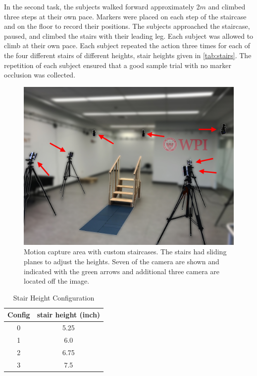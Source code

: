  In the second task, the subjects walked forward approximately 2$m$ and climbed three steps at their own pace. Markers were placed on each step of the staircase and on the floor to record their positions. The subjects approached the staircase, paused, and climbed the stairs with their leading leg. Each subject was allowed to climb at their own pace. Each subject repeated the action three times for each of the four different stairs of different heights, stair heights given in \autoref{tab:stairs}. The repetition of each subject ensured that a good sample trial with no marker occlusion was collected.   
 \begin{figure}[h]
    \centering 
    \includegraphics[scale=0.1,frame]{images/gait_data/stairs_EDIT.jpg}
    \caption[Motion Capture Area]{Motion capture area with custom staircases. The stairs had sliding planes to adjust the heights. Seven of the camera are shown and indicated with the green arrows and additional three camera are located off the image.  }
    \label{fig:mocap} 
\end{figure} 
 
\begin{table}[h!]
\centering
 \begin{tabular}{||c c ||} 
 \hline
 Config & stair height (inch) \\ [0.5ex] 
 \hline\hline
 0 & 5.25  \\ 
 \hline
 1 & 6.0  \\
 \hline
 2 & 6.75  \\
 \hline
 3 & 7.5 \\
 \hline
\end{tabular}
\caption{Stair Height Configuration}
\label{tab:stairs}
\end{table}



